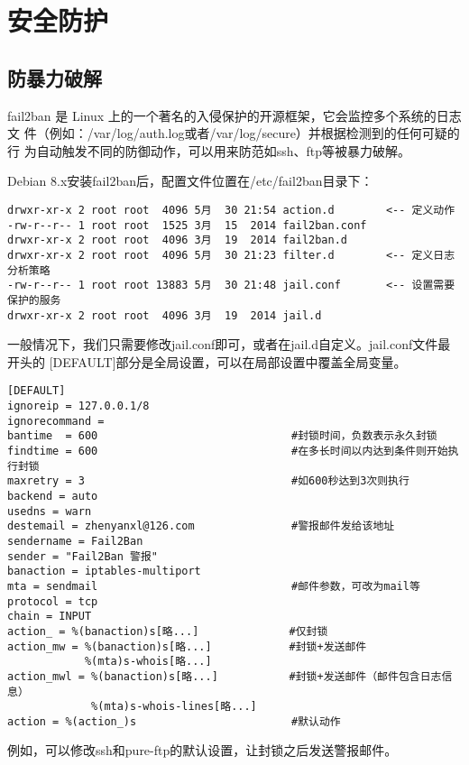 ﻿\chapter{安全防护}

\section{防暴力破解}

fail2ban 是 Linux 上的一个著名的入侵保护的开源框架，它会监控多个系统的日志文
件（例如：/var/log/auth.log或者/var/log/secure）并根据检测到的任何可疑的行
为自动触发不同的防御动作，可以用来防范如ssh、ftp等被暴力破解。

Debian 8.x安装fail2ban后，配置文件位置在/etc/fail2ban目录下：
\begin{Verbatim}[]
drwxr-xr-x 2 root root  4096 5月  30 21:54 action.d        <-- 定义动作
-rw-r--r-- 1 root root  1525 3月  15  2014 fail2ban.conf
drwxr-xr-x 2 root root  4096 3月  19  2014 fail2ban.d
drwxr-xr-x 2 root root  4096 5月  30 21:23 filter.d        <-- 定义日志分析策略
-rw-r--r-- 1 root root 13883 5月  30 21:48 jail.conf       <-- 设置需要保护的服务
drwxr-xr-x 2 root root  4096 3月  19  2014 jail.d
\end{Verbatim}

一般情况下，我们只需要修改jail.conf即可，或者在jail.d自定义。jail.conf文件最开头的%
[DEFAULT]部分是全局设置，可以在局部设置中覆盖全局变量。

\begin{Verbatim}[]
[DEFAULT]
ignoreip = 127.0.0.1/8
ignorecommand =
bantime  = 600                              #封锁时间，负数表示永久封锁
findtime = 600                              #在多长时间以内达到条件则开始执行封锁
maxretry = 3                                #如600秒达到3次则执行
backend = auto
usedns = warn
destemail = zhenyanxl@126.com               #警报邮件发给该地址
sendername = Fail2Ban
sender = "Fail2Ban 警报"
banaction = iptables-multiport
mta = sendmail                              #邮件参数，可改为mail等
protocol = tcp
chain = INPUT
action_ = %(banaction)s[略...]              #仅封锁
action_mw = %(banaction)s[略...]            #封锁+发送邮件
            %(mta)s-whois[略...]
action_mwl = %(banaction)s[略...]           #封锁+发送邮件（邮件包含日志信息）
             %(mta)s-whois-lines[略...]
action = %(action_)s                        #默认动作
\end{Verbatim}

例如，可以修改ssh和pure-ftp的默认设置，让封锁之后发送警报邮件。

